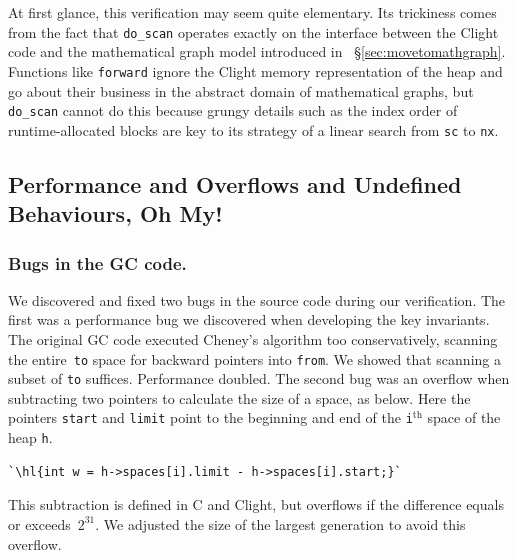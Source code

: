 \documentclass[acmsmall,screen]{acmart}
\newcommand{\li}[1]{{\texttt{\small #1}}}
\newcommand{\hl}[1]{\colorbox{lightgray}{#1}}
\begin{document}
At first glance, this verification may seem quite elementary. 
Its trickiness comes from the fact
that \li{do\_scan} operates exactly on the interface between the Clight code 
and the mathematical graph model introduced in ~\S\ref{sec:movetomathgraph}.
Functions like \li{forward} ignore the Clight memory representation 
of the heap and go about their business in the abstract domain
of mathematical graphs, but \li{do\_scan} cannot do this because grungy 
details such as the index order of runtime-allocated blocks are key to its strategy of a
linear search from \li{sc} to \li{nx}.



\subsection{Performance and Overflows and Undefined Behaviours, Oh My!} \label{sec:gcissues}
\label{sec:gcissues}

\subsubsection*{Bugs in the GC code.}
We discovered and fixed two bugs in the source code during our verification.
The first was a performance bug we discovered when developing the key invariants.
The original GC code executed Cheney's algorithm too conservatively,
scanning the entire~\li{to} space for backward pointers into \li{from}. We
showed that scanning a subset of \li{to} suffices.  Performance doubled.
The second bug was an overflow when subtracting two pointers
to calculate the size of a space, as below. Here the pointers \li{start} and \li{limit}
point to the beginning and end of the \li{i}$^{\text{th}}$ space of the
heap \li{h}.
\begin{lstlisting}[numbers=none]
  `\hl{int w = h->spaces[i].limit - h->spaces[i].start;}`
\end{lstlisting}
This subtraction is defined in C and Clight, but
overflows if the difference equals
or exceeds~$2^{31}$. We adjusted the size of the largest generation to avoid this overflow.
\end{document}
